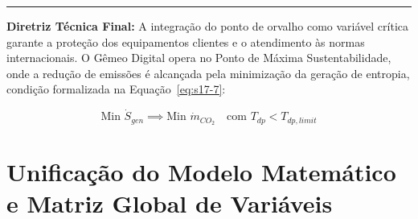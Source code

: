 \documentclass[12pt,a4paper]{article}
\numberwithin{equation}{section}
\numberwithin{table}{section}
\numberwithin{figure}{section}
\begin{document}
{\vspace{1em}
\hrule
\vspace{1em}

\textbf{Diretriz Técnica Final:} A integração do ponto de orvalho como variável crítica garante a proteção dos equipamentos clientes e o atendimento às normas internacionais. O Gêmeo Digital opera no Ponto de Máxima Sustentabilidade, onde a redução de emissões é alcançada pela minimização da geração de entropia, condição formalizada na Equação~\eqref{eq:s17-7}:

\begin{equation}\label{eq:s17-7}
\boxed{\text{Min } \dot{S}_{gen} \implies \text{Min } \dot{m}_{CO_2} \quad \text{com } T_{dp} < T_{dp,limit}}
\end{equation}




\clearpage
\section{Unificação do Modelo Matemático e Matriz Global de Variáveis}

}
\end{document}
